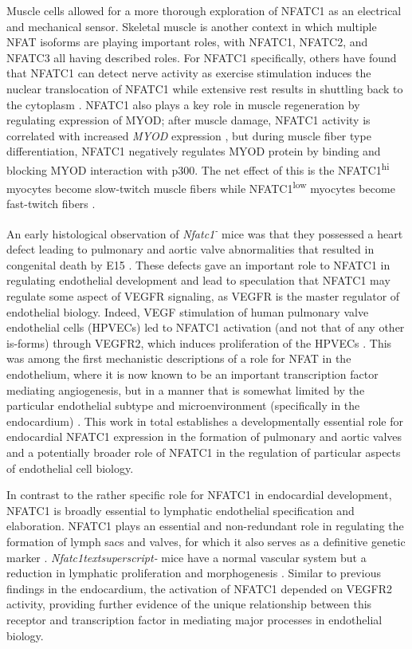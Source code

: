 Muscle cells allowed for a more thorough exploration of NFATC1 as an electrical and mechanical sensor. Skeletal muscle is another context in which multiple NFAT isoforms are playing important roles, with NFATC1, NFATC2, and NFATC3 all having described roles. For NFATC1 specifically, others have found that NFATC1 can detect nerve activity as exercise stimulation induces the nuclear translocation of NFATC1 while extensive rest results in shuttling back to the cytoplasm \citep{Tothova2006}. NFATC1 also plays a key role in muscle regeneration by regulating expression of MYOD; after muscle damage, NFATC1 activity is correlated with increased \textit{MYOD} expression \citep{Sakuma2003}, but during muscle fiber type differentiation, NFATC1 negatively regulates MYOD protein by binding and blocking MYOD interaction with p300. The net effect of this is the NFATC1\textsuperscript{hi} myocytes become slow-twitch muscle fibers while NFATC1\textsuperscript{low} myocytes become fast-twitch fibers \citep{Ehlers2014}. 

An early histological observation of \textit{Nfatc1\textsuperscript{-\-}} mice was that they possessed a heart defect leading to pulmonary and aortic valve abnormalities that resulted in congenital death by E15 \citep{Pompa1998, Ranger1998}. These defects gave an important role to NFATC1 in regulating endothelial development and lead to speculation that NFATC1 may regulate some aspect of VEGFR signaling, as VEGFR is the master regulator of endothelial biology. Indeed, VEGF stimulation of human pulmonary valve endothelial cells (HPVECs) led to NFATC1 activation (and not that of any other is-forms) through VEGFR2, which induces proliferation of the HPVECs \citep{Johnson2003}. This was among the first mechanistic descriptions of a role for NFAT in the endothelium, where it is now known to be an important transcription factor mediating angiogenesis, but in a manner that is somewhat limited by the particular endothelial subtype and microenvironment (specifically in the endocardium) \citep{Jang2010, Wu2012, Wu2013, Gunawan2020}. This work in total establishes a developmentally essential role for endocardial NFATC1 expression in the formation of pulmonary and aortic valves and a potentially broader role of NFATC1 in the regulation of particular aspects of endothelial cell biology.

In contrast to the rather specific role for NFATC1 in endocardial development, NFATC1 is broadly essential to lymphatic endothelial specification and elaboration. NFATC1 plays an essential and non-redundant role in regulating the formation of lymph sacs and valves, for which it also serves as a definitive genetic marker \citep{Shin2019}. \textit{Nfatc1textsuperscript{-\-}} mice have a normal vascular system but a reduction in lymphatic proliferation and morphogenesis \citep{Kulkarni2009, Norrmen2009}. Similar to previous findings in the endocardium, the activation of NFATC1 depended on VEGFR2 activity, providing further evidence of the unique relationship between this receptor and transcription factor in mediating major processes in endothelial biology. 

